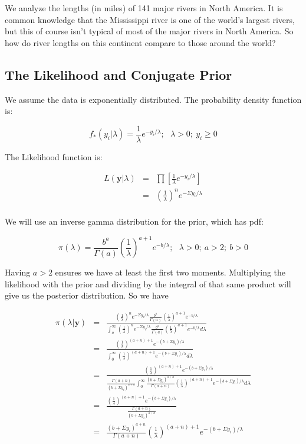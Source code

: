 \documentclass[12pt]{article}
\begin{document}
\noindent We analyze the lengths (in miles) of 141 major rivers in North America.  It is common knowledge that the Mississippi river is one of the world's largest rivers, but this of course isn't typical of most of the major rivers in North America.  So how do river lengths on this continent compare to those around the world?

\subsection{The Likelihood and Conjugate Prior}

\noindent We assume the data is exponentially distributed.  The probability density function is:

\[f_*(y_i|\lambda)=\frac{1}{\lambda}e^{-y_i/\lambda};\ \ \ \lambda>0;\ y_i\geq 0 \]

\noindent The Likelihood function is:

\begin{eqnarray*}
L(\mathbf{y}|\lambda) &=& \prod\left[\frac{1}{\lambda}e^{-y_i/\lambda}\right] \\
&=& \left(\frac{1}{\lambda}\right)^ne^{-\Sigma y_i/\lambda} \\
\end{eqnarray*}

\noindent We will use an inverse gamma distribution for the prior, which has pdf:

\[\pi(\lambda)=\frac{b^a}{\Gamma(a)}\left(\frac{1}{\lambda}\right)^{a+1}e^{-b/\lambda};\ \ \ \lambda>0;\ a>2;\ b>0\]

\noindent Having $a>2$ ensures we have at least the first two moments. Multiplying the likelihood with the prior and dividing by the integral of that same product will give us the posterior distribution.  So we have

\begin{eqnarray*}
\pi(\lambda|\mathbf{y}) &=& \frac{\left(\frac{1}{\lambda}\right)^ne^{-\Sigma y_i/\lambda}\frac{b^a}{\Gamma(a)}\left(\frac{1}{\lambda}\right)^{a+1}e^{-b/\lambda}}{\int_o^\infty \left(\frac{1}{\lambda}\right)^ne^{-\Sigma y_i/\lambda}\frac{b^a}{\Gamma(a)}\left(\frac{1}{\lambda}\right)^{a+1}e^{-b/\lambda}d\lambda} \\
&=& \frac{\left(\frac{1}{\lambda}\right)^{(a+n)+1}e^{-(b+\Sigma y_i)/\lambda}}{\int_0^\infty \left(\frac{1}{\lambda}\right)^{(a+n)+1}e^{-(b+\Sigma y_i)/\lambda}d\lambda} \\
&=& \frac{\left(\frac{1}{\lambda}\right)^{(a+n)+1}e^{-(b+\Sigma y_i)/\lambda}}{\frac{\Gamma(a+n)}{(b+\Sigma y_i)^{a+n}}\int_0^\infty \frac{(b+\Sigma y_i)^{a+n}}{\Gamma(a+n)}\left(\frac{1}{\lambda}\right)^{(a+n)+1}e^{-(b+\Sigma y_i)/\lambda}d\lambda} \\
&=& \frac{\left(\frac{1}{\lambda}\right)^{(a+n)+1}e^{-(b+\Sigma y_i)/\lambda}}{\frac{\Gamma(a+n)}{(b+\Sigma y_i)^{a+n}}} \\
&=& \frac{(b+\Sigma y_i)^{a+n}}{\Gamma(a+n)}\left(\frac{1}{\lambda}\right)^{(a+n)+1}e^{-(b+\Sigma y_i)/\lambda} \\
\end{eqnarray*}
\end{document}
